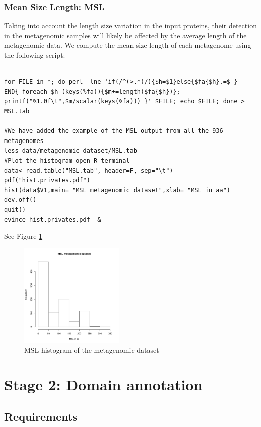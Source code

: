 \documentclass[a4paper,11pt]{report}
\begin{document}
\subsubsection{Mean Size Length: MSL}
\label{mslsub}
Taking into account the length size variation in the input proteins, their detection in the metagenomic samples will likely be affected by the average length of the metagenomic data. We compute the mean size length of each metagenome using the following script:

\begin{verbatim}

for FILE in *; do perl -lne 'if(/^(>.*)/){$h=$1}else{$fa{$h}.=$_} 
END{ foreach $h (keys(%fa)){$m+=length($fa{$h})}; 
printf("%1.0f\t",$m/scalar(keys(%fa))) }' $FILE; echo $FILE; done > 
MSL.tab

#We have added the example of the MSL output from all the 936 metagenomes  
less data/metagenomic_dataset/MSL.tab
#Plot the histogram open R terminal 
data<-read.table("MSL.tab", header=F, sep="\t")
pdf("hist.privates.pdf")
hist(data$V1,main= "MSL metagenomic dataset",xlab= "MSL in aa")
dev.off()
quit()
evince hist.privates.pdf  & 
\end{verbatim}
See Figure \ref{fig:msl_metagenomes}

  \begin{figure}[H]
  \centering
    \includegraphics[width=50mm, scale=0.8]{hist.pdf}
    \caption{MSL histogram of the metagenomic dataset }
        \label{fig:msl_metagenomes}
\end{figure}


\section{Stage 2: Domain annotation}
\label{stage2}

\subsection {Requirements}
\end{document}
